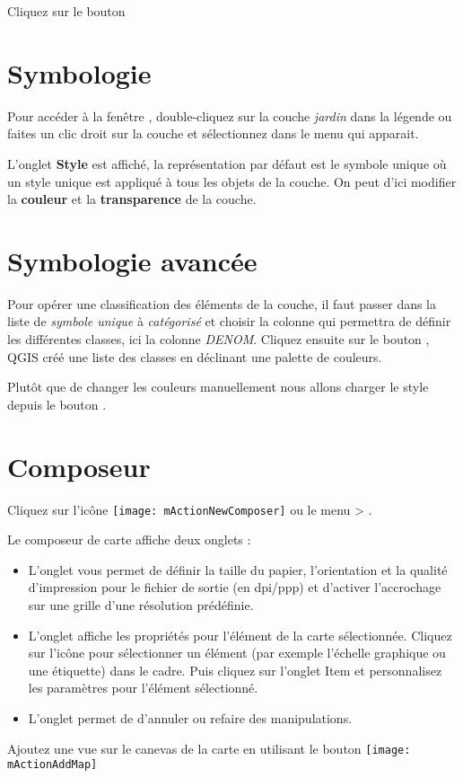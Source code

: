 Cliquez sur le bouton 

\section{Symbologie}

Pour accéder à la fenêtre , double-cliquez sur la couche \textit{jardin} dans la légende ou faites un clic droit sur la couche et sélectionnez  dans le menu qui apparait.

L'onglet \textbf{Style} est affiché, la représentation par défaut est le symbole unique où un style unique est appliqué à tous les objets de la couche. On peut d'ici modifier la \textbf{couleur} et la \textbf{transparence} de la couche.
        
\section{Symbologie avancée}
  
Pour opérer une classification des éléments de la couche, il faut passer dans la liste de \textit{symbole unique} à \textit{catégorisé} et choisir la colonne qui permettra de définir les différentes classes, ici la colonne \textit{DENOM}. Cliquez ensuite sur le bouton , QGIS créé une liste des classes en déclinant une palette de couleurs.

Plutôt que de changer les couleurs manuellement nous allons charger le style  depuis le bouton .

\section{Composeur}

Cliquez sur l'icône \texttt{[image: mActionNewComposer]} ou le menu  > .

Le composeur de carte affiche deux onglets :

\begin{itemize}[label=--]
\item L'onglet  vous permet de définir la taille du papier, l'orientation et la qualité d'impression pour le fichier de sortie (en dpi/ppp) et d'activer l'accrochage sur une grille d'une résolution prédéfinie.
\item L'onglet  affiche les propriétés pour l'élément de la carte sélectionnée. Cliquez sur l'icône   pour sélectionner un élément (par exemple l'échelle graphique ou une étiquette) dans le cadre. Puis cliquez sur l'onglet Item et personnalisez les paramètres pour l'élément sélectionné.
\item L'onglet  permet de d'annuler ou refaire des manipulations.
\end{itemize}

Ajoutez une vue sur le canevas de la carte en utilisant le bouton \texttt{[image: mActionAddMap]}